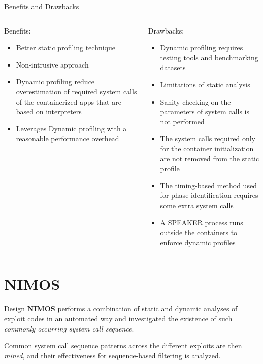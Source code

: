 \documentclass{beamer}
\begin{document}
\begin{frame}{Benefits and Drawbacks}
\begin{columns}
\begin{column}{0.5\textwidth}
Benefits:
\begin{itemize}
    \item[\textcolor{newgreen}{\textbullet}] Better static profiling technique
    \item[\textcolor{newgreen}{\textbullet}] Non-intrusive approach
    \item[\textcolor{newgreen}{\textbullet}] Dynamic profiling reduce overestimation of required system calls of the containerized apps that are based on interpreters
    \item[\textcolor{newgreen}{\textbullet}] Leverages Dynamic profiling with a reasonable performance overhead
\end{itemize}
\end{column}
\begin{column}{0.5\textwidth}
Drawbacks:
\begin{itemize}
    \item[\textcolor{newred}{\textbullet}] Dynamic profiling requires testing tools and benchmarking datasets
    \item[\textcolor{newred}{\textbullet}] Limitations of static analysis
    \item[\textcolor{newred}{\textbullet}] Sanity checking on the parameters of system calls is not performed
    \item[\textcolor{newred}{\textbullet}] The system calls required only for the container initialization are not removed from the static profile
    \item[\textcolor{newred}{\textbullet}] The timing-based method used for phase identification requires some extra system calls
    \item[\textcolor{newred}{\textbullet}] A SPEAKER process runs outside the containers to enforce dynamic profiles
\end{itemize}
\end{column}
\end{columns}
\end{frame}

\section{NIMOS}

\begin{frame}{Design}
\textbf{NIMOS} performs a combination of static and dynamic analyses of exploit codes in an automated way and investigated the existence of such \emph{commonly occurring system call sequence}.
\vspace{0.2cm}

Common system call sequence patterns across the different exploits are then \emph{mined}, and their effectiveness for sequence-based filtering is analyzed.
\end{frame}
\end{document}
